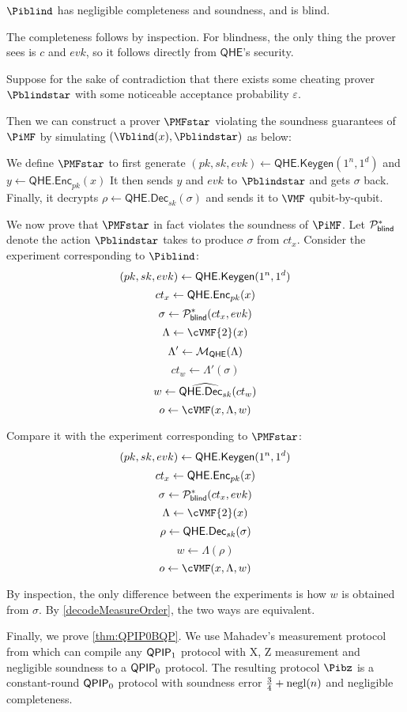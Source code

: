 \begin{thm}
	$\Piblind$ has negligible completeness and soundness, and is blind.
\end{thm}
\begin{prf}
	The completeness follows by inspection.
	For blindness, the only thing the prover sees is $c$ and $evk$, so it follows directly from $\mathsf{QHE}$'s security.
	
	Suppose for the sake of contradiction that there exists some cheating prover $\Pblindstar$ with some noticeable acceptance probability $\varepsilon$.

	Then we can construct a prover $\PMFstar$ violating the soundness guarantees of $\PiMF$ by simulating $(\Vblind(x), \Pblindstar)$ as below:

	We define $\PMFstar$ to first generate
	$(pk, sk, evk)\leftarrow\mathsf{QHE.Keygen}(1^n, 1^d)$
	and
	$y\leftarrow\mathsf{QHE.Enc}_{pk}(x)$
	It then sends $y$ and $evk$ to $\Pblindstar$ and gets $\sigma$ back.
	Finally, it decrypts
	$\rho\leftarrow\mathsf{QHE.Dec}_{sk}(\sigma)$
	and sends it to $\VMF$ qubit-by-qubit.

	We now prove that $\PMFstar$ in fact violates the soundness of $\PiMF$.
	Let $\mathcal{P}_{\mathsf{blind}}^*$ denote the action $\Pblindstar$ takes to produce $\sigma$ from $ct_x$.
	Consider the experiment corresponding to $\Piblind$:
	$$(pk, sk, evk)\leftarrow\mathsf{QHE.Keygen}(1^n, 1^d)$$
	$$ct_x\leftarrow\mathsf{QHE.Enc}_{pk}(x)$$
	$$\sigma\leftarrow\mathcal{P}_{\mathsf{blind}}^*(ct_x, evk)$$
	$$\Lambda\leftarrow\cVMF{2}(x)$$
	$$\Lambda'\leftarrow{\cal M}_{\mathsf{QHE}}(\Lambda)$$
	$$ct_w\leftarrow\Lambda'(\sigma)$$
	$$w\leftarrow\widehat{\mathsf{QHE.Dec}_{sk}}(ct_w)$$
	$$o\leftarrow\cVMF(x, \Lambda, w)$$

	Compare it with the experiment corresponding to $\PMFstar$:
	$$(pk, sk, evk)\leftarrow\mathsf{QHE.Keygen}(1^n, 1^d)$$
	$$ct_x\leftarrow\mathsf{QHE.Enc}_{pk}(x)$$
	$$\sigma\leftarrow\mathcal{P}_{\mathsf{blind}}^*(ct_x, evk)$$
	$$\Lambda\leftarrow\cVMF{2}(x)$$
	$$\rho\leftarrow\mathsf{QHE.Dec}_{sk}(\sigma)$$
	$$w\leftarrow\Lambda(\rho)$$
	$$o\leftarrow\cVMF(x, \Lambda, w)$$

	By inspection, the only difference between the experiments is how $w$ is obtained from $\sigma$.
	By \cref{decodeMeasureOrder}, the two ways are equivalent.
\end{prf}


Finally, we prove \cref{thm:QPIP0BQP}.
We use Mahadev's measurement protocol from \cite{mahadev_delegation} which can compile any $\operatorname{\mathsf{QPIP}}_1$ protocol with X, Z measurement and negligible soundness to a $\operatorname{\mathsf{QPIP}}_0$ protocol.
The resulting protocol $\Pibz$ is a constant-round $\operatorname{\mathsf{QPIP}}_0$ protocol with soundness error $\frac{3}{4} + \operatorname{negl}(n)$ and negligible completeness.

